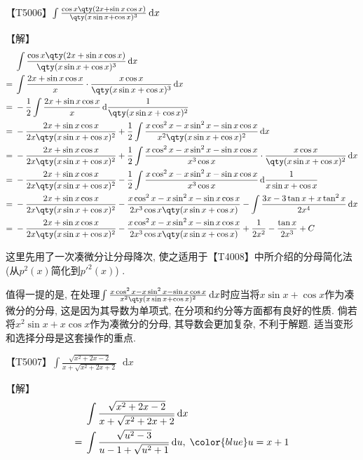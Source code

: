 \documentclass{ctexbook}
\newcommand*{\dif}{\mathop{}\!\mathrm{d}}
\begin{document}
{【T5006】$\int\frac{\cos{x}\qty(2x+\sin{x}\cos{x})}{\qty(x\sin{x}+\cos{x})^{3}}\dif{x}$\par
【解】
\begin{align*}
{}&\int\frac{\cos{x}\qty(2x+\sin{x}\cos{x})}{\qty(x\sin{x}+\cos{x})^{3}}\dif{x}\\
={}&\int\frac{2x+\sin{x}\cos{x}}{x}\cdot\frac{x\cos{x}}{\qty(x\sin{x}+\cos{x})^{3}}\dif{x}\\
={}&-\frac{1}{2}\int\frac{2x+\sin{x}\cos{x}}{x}\dif{\frac{1}{\qty(x\sin{x}+\cos{x})^{2}}}\\
={}&-\frac{2x+\sin{x}\cos{x}}{2x\qty(x\sin{x}+\cos{x})^{2}}+\frac{1}{2}\int\frac{x\cos^{2}{x}-x\sin^{2}{x}-\sin{x}\cos{x}}{x^{2}\qty(x\sin{x}+\cos{x})^{2}}\dif{x}\\
={}&-\frac{2x+\sin{x}\cos{x}}{2x\qty(x\sin{x}+\cos{x})^{2}}+\frac{1}{2}\int\frac{x\cos^{2}{x}-x\sin^{2}{x}-\sin{x}\cos{x}}{x^{3}\cos{x}}\cdot\frac{x\cos{x}}{\qty(x\sin{x}+\cos{x})^{2}}\dif{x}\\
={}&-\frac{2x+\sin{x}\cos{x}}{2x\qty(x\sin{x}+\cos{x})^{2}}-\frac{1}{2}\int\frac{x\cos^{2}{x}-x\sin^{2}{x}-\sin{x}\cos{x}}{x^{3}\cos{x}}\dif{\frac{1}{x\sin{x}+\cos{x}}}\\
={}&-\frac{2x+\sin{x}\cos{x}}{2x\qty(x\sin{x}+\cos{x})^{2}}-\frac{x\cos^{2}{x}-x\sin^{2}{x}-\sin{x}\cos{x}}{2x^{3}\cos{x}\qty(x\sin{x}+\cos{x})}-\int\frac{3x-3\tan{x}+x\tan^{2}{x}}{2x^{4}}\dif{x}\\
={}&-\frac{2x+\sin{x}\cos{x}}{2x\qty(x\sin{x}+\cos{x})^{2}}-\frac{x\cos^{2}{x}-x\sin^{2}{x}-\sin{x}\cos{x}}{2x^{3}\cos{x}\qty(x\sin{x}+\cos{x})}+\frac{1}{2x^{2}}-\frac{\tan{x}}{2x^{3}}+C
\end{align*}\par
{\kaishu 这里先用了一次凑微分让分母降次, 使之适用于【T4008】中所介绍的分母简化法 (从$p^{2}(x)$简化到$p'^{2}(x)$) . \par
值得一提的是, 在处理$\int\frac{x\cos^{2}{x}-x\sin^{2}{x}-\sin{x}\cos{x}}{x^{2}\qty(x\sin{x}+\cos{x})^{2}}\dif{x}$时应当将$x\sin{x}+\cos{x}$作为凑微分的分母, 这是因为其导数为单项式, 在分项和约分等方面都有良好的性质. 倘若将$x^{2}\sin{x}+x\cos{x}$作为凑微分的分母, 其导数会更加复杂, 不利于解题. 适当变形和选择分母是这套操作的重点. \par}
【T5007】$\int\frac{\sqrt{x^{2}+2x-2}}{x+\sqrt{x^{2}+2x+2}}\dif{x}$\par
【解】
\begin{align*}
{}&\int\frac{\sqrt{x^{2}+2x-2}}{x+\sqrt{x^{2}+2x+2}}\dif{x}\\
={}&\int\frac{\sqrt{u^{2}-3}}{u-1+\sqrt{u^{2}+1}}\dif{u},\;{\color{blue}u=x+1}\\

\end{align*}}
\end{document}
